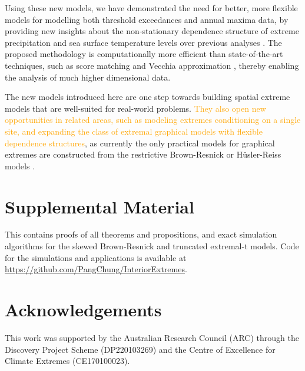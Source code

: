 \documentclass[12pt]{article}
\newcommand{\PZ}{\textcolor{orange}}
\begin{document}


Using these new models, we have demonstrated
the need for better, more flexible models for
modelling both threshold exceedances and annual maxima data, 
by providing new insights about the non-stationary dependence structure of extreme precipitation and sea surface temperature levels over previous analyses \citep{deFondeville.Davison:2018,Huser.Zhong:2023}. 
The proposed methodology is 
computationally more efficient than state-of-the-art techniques, such as score matching \citep{deFondeville.Davison:2018} and Vecchia approximation \citep{Huser.Zhong:2023}, 
thereby enabling the analysis of much higher dimensional data. 

The new models introduced here are one step towards building spatial extreme models that are well-suited for real-world problems.
\PZ{They also open new opportunities in related areas, such as modeling extremes conditioning on a single site, and expanding the class of extremal graphical models with flexible dependence structures}, as currently the only practical models for graphical extremes are constructed from the restrictive Brown-Resnick or H\"usler-Reiss models \citep{Engelke.Hitz:2020,Hentschel.Engelke.Segers:2024,Wan.Zhou:2023}. 


\section*{Supplemental Material}

This contains proofs of all theorems and propositions, and exact simulation algorithms for the skewed Brown-Resnick and truncated extremal-t models. Code for the simulations and applications is available at \url{https://github.com/PangChung/InteriorExtremes}. 

\section*{Acknowledgements}

This work was supported by the Australian Research Council (ARC) through the Discovery Project Scheme (DP220103269) and the Centre of Excellence for Climate Extremes (CE170100023). 

\baselineskip=18pt


\end{document}
